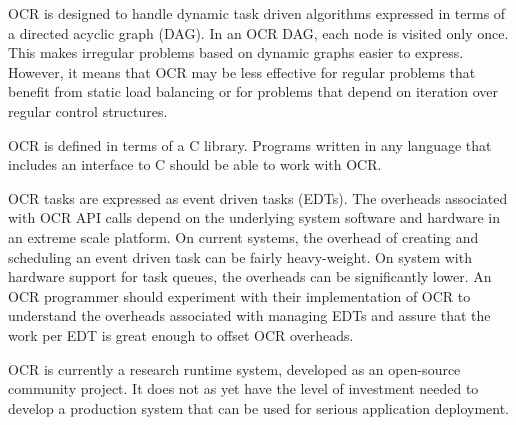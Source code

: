 OCR is designed to handle dynamic task driven algorithms expressed in
terms of a directed acyclic graph (DAG). In an OCR DAG, each node is
visited only once. This makes irregular problems based on dynamic
graphs easier to express. However, it means that OCR may be less
effective for regular problems that benefit from static load balancing
or for problems that depend on iteration over regular control
structures.
%

OCR is defined in terms of a C library. Programs written in any
language that includes an interface to C should be able to work with
OCR.

OCR tasks are expressed as event driven tasks (EDTs). 
The overheads associated with OCR API calls depend on the underlying system software and
hardware in an extreme scale platform.  On current systems, the overhead of
creating and scheduling an event driven task can be fairly heavy-weight.  
On system with hardware support for task queues, the
overheads can be significantly lower.  An OCR programmer should experiment with their
implementation of OCR to understand the overheads associated with managing EDTs and 
assure that the work per EDT is great enough to offset OCR overheads.

OCR is currently a research runtime system, developed as an
open-source community project. It does not as yet have the level of
investment needed to develop a production system that can be used for
serious application deployment.
